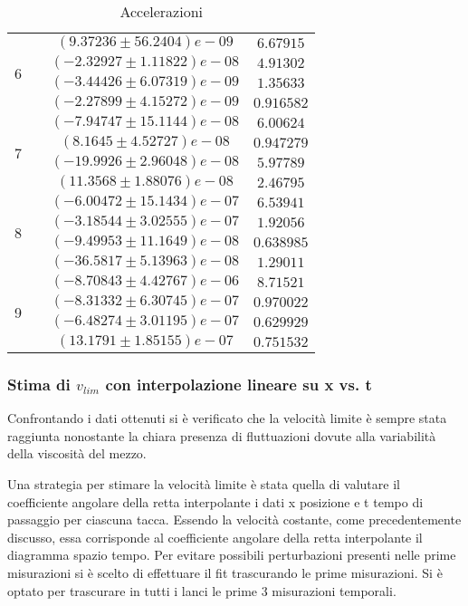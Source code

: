 \documentclass[a4paper,11pt,oneside]{article}
\begin{document}
\begin{table}[h!]
\begin{tabular}{|c|c|c|c|}
    \hline
    \multirow{4}{*}{6}& & $(9.37236 \pm 56.2404)e-09$ & $6.67915$\\
    & & $(-2.32927 \pm 1.11822)e-08$ & $4.91302$\\
    & & $(-3.44426 \pm 6.07319)e-09$ & $1.35633$\\
    & & $(-2.27899 \pm 4.15272)e-09$ & $0.916582$\\
    \hline
    \multirow{4}{*}{7}& & $(-7.94747 \pm 15.1144)e-08$ & $6.00624$\\
    & & $(8.1645 \pm 4.52727)e-08$ & $0.947279$\\
    & & $(-19.9926 \pm 2.96048)e-08$ & $5.97789$\\
    & & $(11.3568 \pm 1.88076)e-08$ & $2.46795$\\
    \hline
    \multirow{4}{*}{8}& & $(-6.00472 \pm 15.1434)e-07$ & $6.53941$\\
    & & $(-3.18544 \pm 3.02555)e-07$ & $1.92056$\\
    & & $(-9.49953 \pm 11.1649)e-08$ & $0.638985$\\
    & & $(-36.5817 \pm 5.13963)e-08$ & $1.29011$\\
    \hline
    \multirow{4}{*}{9}& & $(-8.70843 \pm 4.42767)e-06$ & $8.71521$\\
    & & $(-8.31332 \pm 6.30745)e-07$ & $0.970022$\\
    & & $(-6.48274 \pm 3.01195)e-07$ & $0.629929$\\
    & & $(13.1791 \pm 1.85155)e-07$ & $0.751532$\\
    \hline
    \end{tabular}
    \caption{Accelerazioni}
    \label{tab:accelerazioni}
\end{table}


\subsubsection*{Stima di $v_{lim}$ con interpolazione lineare su x vs. t }
Confrontando i dati ottenuti si è verificato che la velocità limite è sempre stata raggiunta nonostante la chiara presenza di fluttuazioni dovute alla variabilità della viscosità del mezzo. 

Una strategia per stimare la velocità limite è stata quella di valutare il coefficiente angolare della retta interpolante i dati x posizione e t tempo di passaggio per ciascuna tacca.
Essendo la velocità costante, come precedentemente discusso, essa corrisponde al coefficiente angolare della retta interpolante il diagramma spazio tempo. Per evitare possibili perturbazioni presenti nelle prime misurazioni si è scelto di effettuare il fit trascurando le prime misurazioni. Si è optato per trascurare in tutti i lanci le prime 3 misurazioni temporali.
\end{document}
